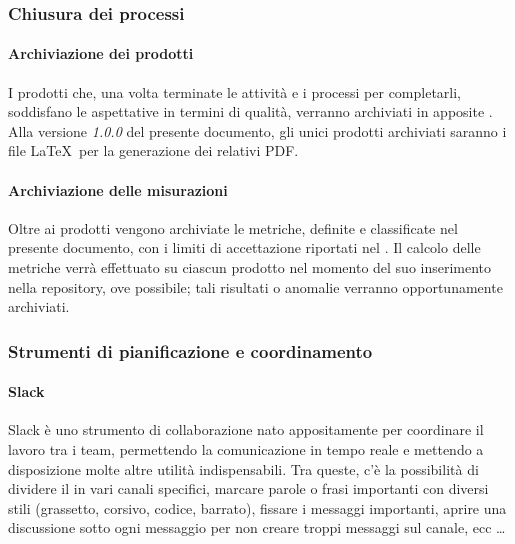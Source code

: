 
		\subsubsection{Chiusura dei processi}

    		\paragraph{Archiviazione dei prodotti}
			I prodotti che, una volta terminate le attività e i processi per completarli, soddisfano le aspettative in termini di qualità,
			verranno archiviati in apposite . Alla versione \textit{1.0.0} del presente documento, gli unici prodotti archiviati saranno i file \LaTeX\ per la generazione dei relativi PDF.

    		\paragraph{Archiviazione delle misurazioni}
			Oltre ai prodotti vengono archiviate le metriche, definite e classificate nel presente documento, con i limiti di accettazione riportati nel \Doc{\PdQv}.
			Il calcolo delle metriche verrà effettuato su ciascun prodotto nel momento del suo inserimento nella repository, ove possibile; tali risultati o anomalie verranno opportunamente archiviati. %

    	\subsubsection{Strumenti di pianificazione e coordinamento}\label{pianificazione e coordinamento}

    		\paragraph{Slack}
			Slack è uno strumento di collaborazione nato appositamente per coordinare il lavoro tra i team, permettendo la comunicazione in tempo
			reale e mettendo a disposizione molte altre utilità indispensabili. Tra queste, c'è la possibilità di dividere il  in vari canali specifici, marcare parole o frasi importanti con diversi stili (grassetto, corsivo, codice, barrato), fissare i messaggi importanti, aprire una discussione sotto ogni messaggio per non creare troppi messaggi sul canale, ecc \dots

